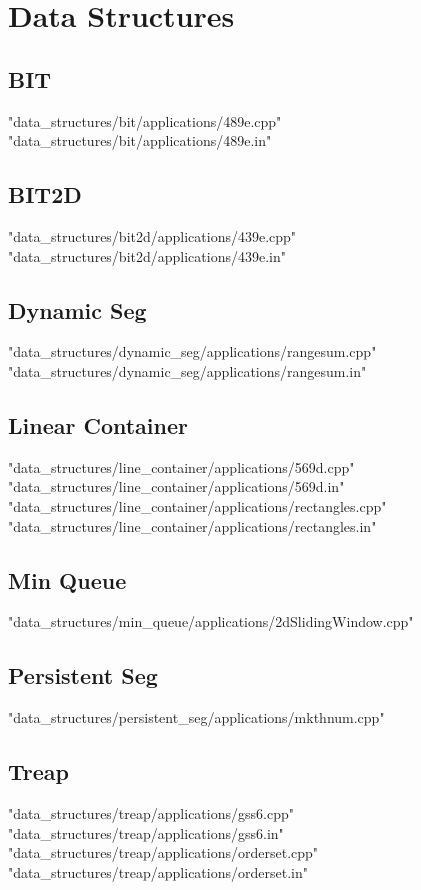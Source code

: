 \documentclass [12pt,onecolumn,oneside]{article}
\begin{document}
\pagestyle{fancy}
\fancyfoot{}
\fancyhead[R]{\thepage}
\renewcommand{\headrulewidth}{0.4pt}
\tableofcontents
\scriptsize

\bigskip

\section{Data Structures}
\subsection{ BIT}
 {"data_structures/bit/applications/489e.cpp"}
 {"data_structures/bit/applications/489e.in"}
\subsection{ BIT2D}
 {"data_structures/bit2d/applications/439e.cpp"}
 {"data_structures/bit2d/applications/439e.in"}
\subsection{ Dynamic Seg}
 {"data_structures/dynamic_seg/applications/rangesum.cpp"}
 {"data_structures/dynamic_seg/applications/rangesum.in"}
\subsection{ Linear Container}
 {"data_structures/line_container/applications/569d.cpp"}
 {"data_structures/line_container/applications/569d.in"}
 {"data_structures/line_container/applications/rectangles.cpp"}
 {"data_structures/line_container/applications/rectangles.in"}
\subsection{ Min Queue}
 {"data_structures/min_queue/applications/2dSlidingWindow.cpp"}
\subsection{ Persistent Seg}
 {"data_structures/persistent_seg/applications/mkthnum.cpp"}
\subsection{ Treap}
 {"data_structures/treap/applications/gss6.cpp"}
 {"data_structures/treap/applications/gss6.in"}
 {"data_structures/treap/applications/orderset.cpp"}
 {"data_structures/treap/applications/orderset.in"}
\end{document}
